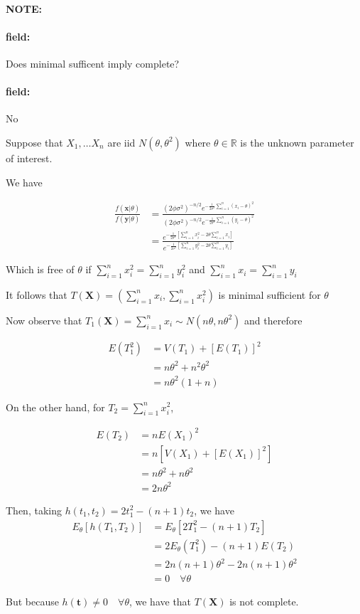 \documentclass[12pt]{article}
\newenvironment{note}{\paragraph{NOTE:}}{}
\newenvironment{field}{\paragraph{field:}}{}
\begin{document}
\begin{note}
  \begin{field}
    Does minimal sufficent imply complete?
  \end{field}
  \begin{field}
    No

    Suppose that $X_1, \ldots X_n$ are iid $N(\theta,\theta^2)$ where $\theta \in \mathbb{R}$ is the unknown parameter of interest.

    We have

    \begin{align*}
      \frac{f(\mathbf{x}|\theta)}{f(\mathbf{y}|\theta)}
      &= \frac{(2\phi\sigma^2)^{-n/2}e^{-\frac{1}{2\sigma^2}\sum_{i =1}^n (x_i -\theta)^2}}{(2\phi\sigma^2)^{-n/2}e^{-\frac{1}{2\sigma^2}\sum_{i =1}^n (y_i -\theta)^2}}\\
      &= \frac{e^{-\frac{1}{2\sigma^2}[\sum _{i = 1}^n x_i^2 - 2\theta \sum _{i = 1}^n x_i]}}{e^{-\frac{1}{2\sigma^2}[\sum _{i = 1}^n y_i^2 - 2\theta \sum _{i = 1}^n y_i]}}
    \end{align*}

    Which is free of $\theta$ if $\sum _{i = 1}^n x_i^2 = \sum _{i = 1}^n y_i^2$ and $\sum _{i = 1}^n x_i = \sum _{i = 1}^n y_i$

    It follows that $T(\mathbf{X}) = (\sum _{i = 1}^n x_i, \sum _{i = 1}^n x_i^2)$ is minimal sufficient for $\theta$

    Now observe that $T_1(\mathbf{X}) = \sum _{i = 1}^n x_i \sim N(n\theta, n\theta^2)$ and therefore

    \begin{align*}
      E(T_1^2) &= V(T_1) + [E(T_1)]^2\\
      &= n\theta^2 + n^2\theta^2\\
      &= n\theta^2(1 + n)
    \end{align*}

    On the other hand, for $T_2 = \sum _{i = 1}^n x_i^2$,

    \begin{align*}
      E(T_2) &= n E(X_1)^2\\
      &= n[V(X_1) + [E(X_1)]^2]\\
      &= n\theta^2 + n\theta^2\\
      &= 2n\theta^2
    \end{align*}

    Then, taking $h(t_1,t_2) = 2t_1^2 - (n+1)t_2$, we have
    \begin{align*}
      E_\theta[h(T_1,T_2)] &= E_\theta[2T_1^2 - (n+1)T_2]\\
      &= 2E_\theta(T_1^2) - (n+1)E(T_2)\\
      &= 2n(n+1)\theta^2 - 2n(n+1)\theta^2\\
      &= 0 \quad \forall \theta
    \end{align*}

    But because $h(\mathbf{t}) \neq 0 \quad \forall \theta$, we have that $T(\mathbf{X})$ is not complete.
  \end{field}
\end{note}
\end{document}
